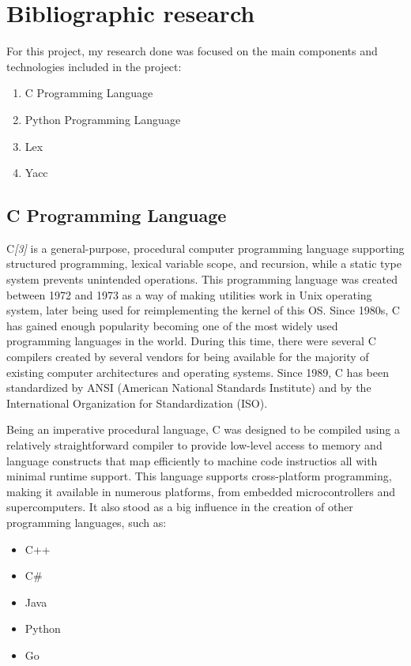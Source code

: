 \documentclass[12pt,a4paper,twoside]{report}
\begin{document}
\chapter{Bibliographic research}

For this project, my research done was focused on the main components and technologies included in the project:
\begin{enumerate}\bfseries
	\item C Programming Language
	\item Python Programming Language
	\item Lex
	\item Yacc
\end{enumerate}
 
\section{C Programming Language}
 C{\it[3]} is a general-purpose, procedural computer programming language supporting structured programming, lexical variable scope, and recursion, while a static type system prevents unintended operations. This programming language was created between 1972 and 1973 as a way of making utilities work in Unix operating system, later being used for reimplementing the kernel of this OS. Since 1980s, C has gained enough popularity becoming one of the most widely used programming languages in the world. During this time, there were several C compilers created by several vendors for being available for the majority of existing computer architectures and operating systems. Since 1989, C has been standardized by ANSI (American National Standards Institute) and by the International Organization for Standardization (ISO). 
  
 Being an imperative procedural language, C was designed to be compiled using a relatively straightforward compiler to provide low-level access to memory and language constructs that map efficiently to machine code instructios all with minimal runtime support. This language supports cross-platform programming, making it available in numerous platforms, from embedded microcontrollers and supercomputers. It also stood as a big influence in the creation of other programming languages, such as:
 \begin{itemize}
 	\item C++
 	\item C\#
 	\item Java
 	\item Python
 	\item Go
 \end{itemize}
\end{document}
